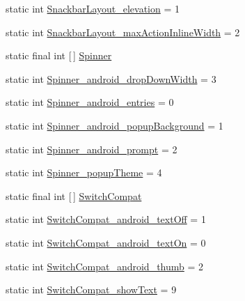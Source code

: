 \begin{DoxyCompactItemize}
\item 
static int \hyperlink{classandroid_1_1support_1_1v7_1_1appcompat_1_1R_1_1styleable_abb92d0272ef9198076ff5b305902bc7c}{Snackbar\+Layout\+\_\+elevation} = 1
\item 
static int \hyperlink{classandroid_1_1support_1_1v7_1_1appcompat_1_1R_1_1styleable_a2759504e9ac635133f732820f34b2035}{Snackbar\+Layout\+\_\+max\+Action\+Inline\+Width} = 2
\item 
static final int \mbox{[}$\,$\mbox{]} \hyperlink{classandroid_1_1support_1_1v7_1_1appcompat_1_1R_1_1styleable_a63a8e6de3d44afcd176eaa79214fd8a5}{Spinner}
\item 
static int \hyperlink{classandroid_1_1support_1_1v7_1_1appcompat_1_1R_1_1styleable_a59418e3a2059e81ba6e01aaa6d3e8abd}{Spinner\+\_\+android\+\_\+drop\+Down\+Width} = 3
\item 
static int \hyperlink{classandroid_1_1support_1_1v7_1_1appcompat_1_1R_1_1styleable_a7d15e5e4370ddab8e292c37d54f20e02}{Spinner\+\_\+android\+\_\+entries} = 0
\item 
static int \hyperlink{classandroid_1_1support_1_1v7_1_1appcompat_1_1R_1_1styleable_a38691d098e8e7107eb730f59c1401cfc}{Spinner\+\_\+android\+\_\+popup\+Background} = 1
\item 
static int \hyperlink{classandroid_1_1support_1_1v7_1_1appcompat_1_1R_1_1styleable_ab4f59c7bdece7629eb5ff24a1cb7e934}{Spinner\+\_\+android\+\_\+prompt} = 2
\item 
static int \hyperlink{classandroid_1_1support_1_1v7_1_1appcompat_1_1R_1_1styleable_abc081afdc0bd846ad86fc722e41e48db}{Spinner\+\_\+popup\+Theme} = 4
\item 
static final int \mbox{[}$\,$\mbox{]} \hyperlink{classandroid_1_1support_1_1v7_1_1appcompat_1_1R_1_1styleable_aabe688560752254f2288f3eaf9439737}{Switch\+Compat}
\item 
static int \hyperlink{classandroid_1_1support_1_1v7_1_1appcompat_1_1R_1_1styleable_ab702347a8caf8f0d2094e14753c1a529}{Switch\+Compat\+\_\+android\+\_\+text\+Off} = 1
\item 
static int \hyperlink{classandroid_1_1support_1_1v7_1_1appcompat_1_1R_1_1styleable_a1e5c459913d5c2e521fc63aff248c339}{Switch\+Compat\+\_\+android\+\_\+text\+On} = 0
\item 
static int \hyperlink{classandroid_1_1support_1_1v7_1_1appcompat_1_1R_1_1styleable_a311432ba5ee92aa27c9f9d82bdb14e82}{Switch\+Compat\+\_\+android\+\_\+thumb} = 2
\item 
static int \hyperlink{classandroid_1_1support_1_1v7_1_1appcompat_1_1R_1_1styleable_ae8db0533421066e36c386c0126adfebd}{Switch\+Compat\+\_\+show\+Text} = 9

\end{DoxyCompactItemize}

